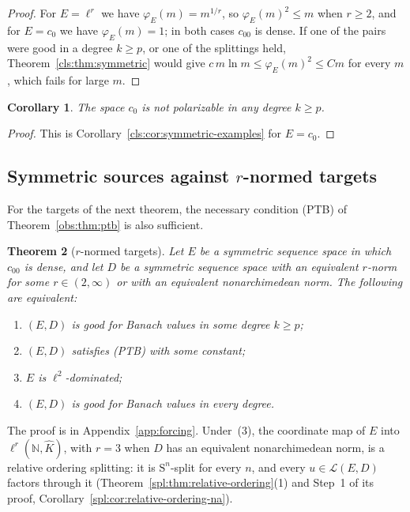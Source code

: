 \documentclass[11pt]{amsart}
\newtheorem{theorem}{Theorem}[section]
\newtheorem{corollary}[theorem]{Corollary}
\theoremstyle{definition}
\theoremstyle{remark}
\numberwithin{equation}{section}
\newcommand{\N}{\mathbb N}
\newcommand{\cL}{\mathcal L}
\newcommand{\Kh}{\widehat K}
\theoremstyle{plain}
\theoremstyle{definition}
\theoremstyle{plain}
\begin{document}
\begin{proof}
For $E=\ell^r$ we have $\varphi_E(m)=m^{1/r}$, so $\varphi_E(m)^2\le m$ when $r\ge2$, and for $E=c_0$ we have
$\varphi_E(m)=1$; in both cases $c_{00}$ is dense. If one of the pairs were good in a degree $k\ge p$, or one of the
splittings held, Theorem~\ref{cls:thm:symmetric} would give $c\,m\ln m\le\varphi_E(m)^2\le Cm$ for every $m$, which
fails for large $m$.
\end{proof}

\begin{corollary}\label{cls:cor:c0-not-polarizable}
The space $c_0$ is not polarizable in any degree $k\ge p$.
\end{corollary}

\begin{proof}
This is Corollary~\ref{cls:cor:symmetric-examples} for $E=c_0$.
\end{proof}

\subsection{Symmetric sources against \texorpdfstring{$r$}{r}-normed targets}

For the targets of the next theorem, the necessary condition \textup{(PTB)} of Theorem~\ref{obs:thm:ptb} is also sufficient.

\begin{theorem}[$r$-normed targets]\label{cls:thm:rnorm}
Let $E$ be a symmetric sequence space in which $c_{00}$ is dense, and let $D$ be a symmetric sequence space with an
equivalent $r$\nobreakdash-norm for some $r\in(2,\infty)$ or with an equivalent nonarchimedean norm. The following are
equivalent:
\begin{enumerate}
\item $(E,D)$ is good for Banach values in some degree $k\ge p$;
\item $(E,D)$ satisfies \textup{(PTB)} with some constant;
\item $E$ is $\ell^2$\nobreakdash-dominated;
\item $(E,D)$ is good for Banach values in every degree.
\end{enumerate}
\end{theorem}

The proof is in Appendix~\ref{app:forcing}. Under~(3), the coordinate map of $E$ into $\ell^r(\N,\Kh)$, with $r=3$ when
$D$ has an equivalent nonarchimedean norm, is a relative ordering splitting: it is $\mathrm S^n$\nobreakdash-split for
every $n$, and every $u\in\cL(E,D)$ factors through it (Theorem~\ref{spl:thm:relative-ordering}(1) and Step~1 of its
proof, Corollary~\ref{spl:cor:relative-ordering-na}).
\end{document}
